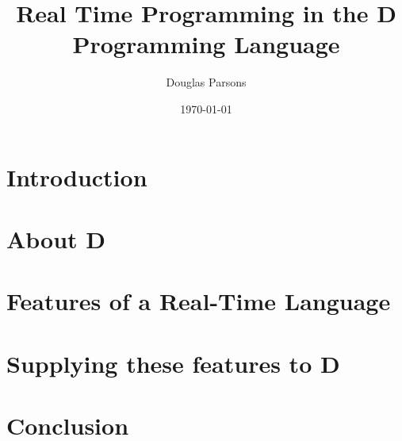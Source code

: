 \documentclass[a4paper, 11pt]{article}
\title{Real Time Programming in the D Programming Language}
\author{Douglas Parsons}
\date{\today}
\begin{document}
\maketitle
%
\section{Introduction}

\section{About D}

\section{Features of a Real-Time Language}

\section{Supplying these features to D}

\section{Conclusion}



%
\end{document}
